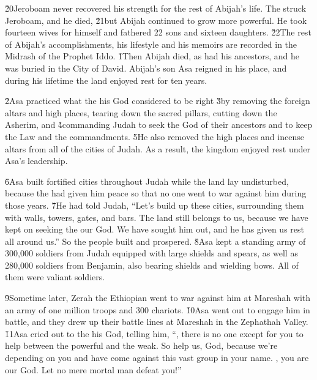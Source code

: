 \v{20}Jeroboam never recovered his strength for the rest of Abijah's life. The  struck Jeroboam, and he died, \v{21}but Abijah continued to grow more powerful. He took fourteen wives for himself and fathered 22 sons and sixteen daughters. \v{22}The rest of Abijah's accomplishments, his lifestyle and his memoirs are recorded in the Midrash of the Prophet Iddo.
\v{1}Then Abijah died, as had his ancestors, and he was buried in the City of David. Abijah's son Asa reigned in his place, and during his lifetime the land enjoyed rest for ten years.

\v{2}Asa practiced what the  his God considered to be right \v{3}by removing the foreign altars and high places, tearing down the sacred pillars, cutting down the Asherim, and \v{4}commanding Judah to seek the  God of their ancestors and to keep the Law and the commandments. \v{5}He also removed the high places and incense altars from all of the cities of Judah. As a result, the kingdom enjoyed rest under Asa's leadership.

\v{6}Asa built fortified cities throughout Judah while the land lay undisturbed, because the  had given him peace so that no one went to war against him during those years. \v{7}He had told Judah, ``Let's build up these cities, surrounding them with walls, towers, gates, and bars. The land still belongs to us, because we have kept on seeking the  our God. We have sought him out, and he has given us rest all around us.'' So the people built and prospered. \v{8}Asa kept a standing army of 300,000 soldiers from Judah equipped with large shields and spears, as well as 280,000 soldiers from Benjamin, also bearing shields and wielding bows. All of them were valiant soldiers.

\v{9}Sometime later, Zerah the Ethiopian went to war against him at Mareshah with an army of one million troops and 300 chariots. \v{10}Asa went out to engage him in battle, and they drew up their battle lines at Mareshah in the Zephathah Valley. \v{11}Asa cried out to the  his God, telling him, ``, there is no one except for you to help between the powerful and the weak. So help us,  God, because we're depending on you and have come against this vast group in your name. , you are our God. Let no mere mortal man defeat you!''

